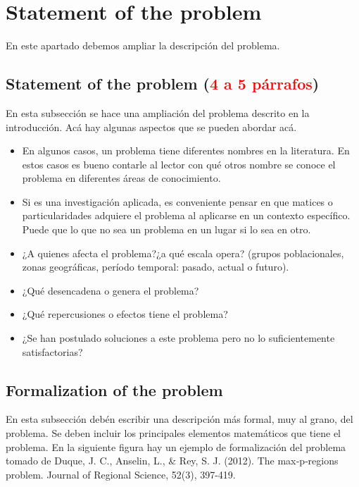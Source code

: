 \documentclass[12pt,letterpaper]{article}
\begin{document}
\section{Statement of the problem}

En este apartado debemos ampliar la descripción del problema.

\subsection{Statement of the problem (\textcolor{red}{4 a 5 párrafos})}

En esta subsección se hace una ampliación del problema descrito en la introducción. Acá hay
algunas aspectos que se pueden abordar acá.

\begin{itemize}
\item En algunos casos, un problema tiene diferentes nombres en la literatura. En estos casos es bueno contarle al lector con qué otros nombre se conoce el problema en diferentes áreas de conocimiento.
\item Si es una investigación aplicada, es conveniente pensar en que matices o particularidades adquiere el problema al aplicarse en un contexto específico. Puede que lo que no sea un problema en un lugar si lo sea en otro.
\item ¿A quienes afecta el problema?¿a qué escala opera? (grupos poblacionales, zonas geográficas, período temporal: pasado, actual o futuro).
\item ¿Qué desencadena o genera el problema?
\item ¿Qué repercusiones o efectos tiene el problema?
\item ¿Se han postulado soluciones a este problema pero no lo suficientemente satisfactorias?
\end{itemize}


\subsection{Formalization of the problem}

En esta subsección debén escribir una descripción más formal, muy al grano,
del problema.  Se deben incluir los principales elementos matemáticos que
tiene el problema.  En la siguiente figura hay un ejemplo de formalización del
problema tomado de Duque, J. C., Anselin, L., \& Rey, S. J. (2012). The
max‐p‐regions problem. Journal of Regional Science, 52(3), 397-419.
\end{document}
